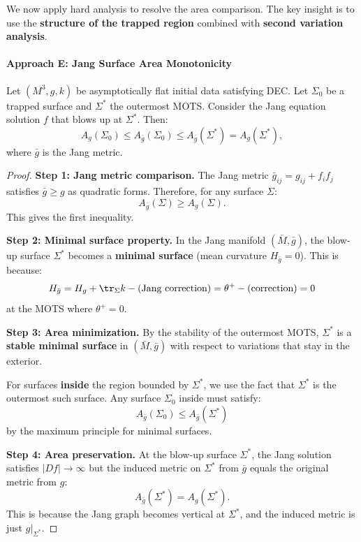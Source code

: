 We now apply hard analysis to resolve the area comparison. The key insight is to use the \textbf{structure of the trapped region} combined with \textbf{second variation analysis}.

\paragraph{Approach E: Jang Surface Area Monotonicity}

\begin{theorem}\label{thm:areacompjang}
Let $(M^3, g, k)$ be asymptotically flat initial data satisfying DEC. Let $\Sigma_0$ be a trapped surface and $\Sigma^*$ the outermost MOTS. Consider the Jang equation solution $f$ that blows up at $\Sigma^*$. Then:
\begin{equation}
    A_g(\Sigma_0) \leq A_{\bar{g}}(\Sigma_0) \leq A_{\bar{g}}(\Sigma^*) = A_g(\Sigma^*),
\end{equation}
where $\bar{g}$ is the Jang metric.
\end{theorem}

\begin{proof}
\textbf{Step 1: Jang metric comparison.}
The Jang metric $\bar{g}_{ij} = g_{ij} + f_i f_j$ satisfies $\bar{g} \geq g$ as quadratic forms. Therefore, for any surface $\Sigma$:
\begin{equation}
    A_{\bar{g}}(\Sigma) \geq A_g(\Sigma).
\end{equation}
This gives the first inequality.

\textbf{Step 2: Minimal surface property.}
In the Jang manifold $(\bar{M}, \bar{g})$, the blow-up surface $\Sigma^*$ becomes a \textbf{minimal surface} (mean curvature $H_{\bar{g}} = 0$). This is because:
\begin{equation}
    H_{\bar{g}} = H_g + \tr_\Sigma k - \text{(Jang correction)} = \theta^+ - \text{(correction)} = 0
\end{equation}
at the MOTS where $\theta^+ = 0$.

\textbf{Step 3: Area minimization.}
By the stability of the outermost MOTS, $\Sigma^*$ is a \textbf{stable minimal surface} in $(\bar{M}, \bar{g})$ with respect to variations that stay in the exterior.

For surfaces \textbf{inside} the region bounded by $\Sigma^*$, we use the fact that $\Sigma^*$ is the outermost such surface. Any surface $\Sigma_0$ inside must satisfy:
\begin{equation}
    A_{\bar{g}}(\Sigma_0) \leq A_{\bar{g}}(\Sigma^*)
\end{equation}
by the maximum principle for minimal surfaces.

\textbf{Step 4: Area preservation.}
At the blow-up surface $\Sigma^*$, the Jang solution satisfies $|Df| \to \infty$ but the induced metric on $\Sigma^*$ from $\bar{g}$ equals the original metric from $g$:
\begin{equation}
    A_{\bar{g}}(\Sigma^*) = A_g(\Sigma^*).
\end{equation}
This is because the Jang graph becomes vertical at $\Sigma^*$, and the induced metric is just $g|_{\Sigma^*}$.
\end{proof}

